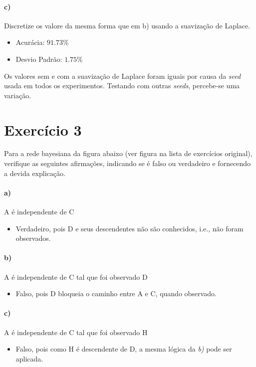 \documentclass{article}
\begin{document}
\paragraph{c)} Discretize os valore da mesma forma que em b) usando a suavização de Laplace.

\begin{itemize}
	\item Acurácia: $91.73\%$
	\item Desvio Padrão: $1.75\%$
\end{itemize}

Os valores sem e com a suavização de Laplace foram iguais por causa da \textit{seed} usada em todos os experimentos. Testando com outras \textit{seeds}, percebe-se uma variação.

\section{Exercício 3}

Para a rede bayesiana da figura abaixo (ver figura na lista de exercícios original), verifique as seguintes afirmações, indicando se é falso ou verdadeiro e fornecendo a devida explicação.

\paragraph{a)} A é independente de C
\begin{itemize}
	\item Verdadeiro, pois D e seus descendentes não são conhecidos, i.e., não foram observados.
\end{itemize}

\paragraph{b)} A é independente de C tal que foi observado D
\begin{itemize}
	\item Falso, pois D bloqueia o caminho entre A e C, quando observado.
\end{itemize}

\paragraph{c)} A é independente de C tal que foi observado H
\begin{itemize}
	\item Falso, pois como H é descendente de D, a mesma lógica da \textit{b)} pode ser aplicada.
\end{itemize}
\end{document}
